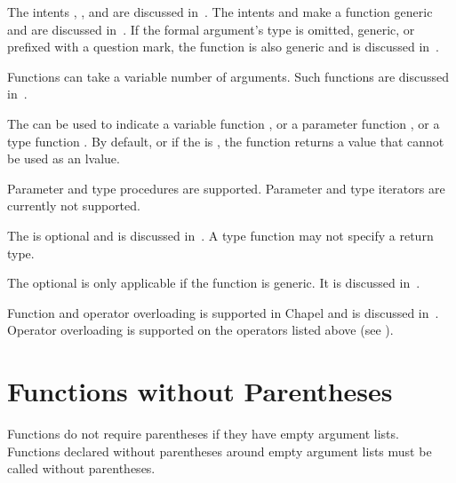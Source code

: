 The intents , , and  are discussed
in~.  The intents  and  make
a function generic and are discussed in~.  If the
formal argument's type is omitted, generic, or prefixed with a question
mark, the function is also generic and is discussed
in~.

Functions can take a variable number of arguments.  Such functions are
discussed in~.

The  can be used to indicate
a variable function ,
or a parameter function ,
or a type function .
By default, or if the  is ,
the function returns a value that cannot be used as an lvalue.

\begin{openissue}
Parameter and type procedures are supported. Parameter and type
iterators are currently not supported.
\end{openissue}

The  is optional and is discussed in~.
A type function may not specify a return type.

The optional  is only applicable if the function is
generic.  It is discussed in~.

Function and operator overloading is supported in Chapel and is
discussed in~.
Operator overloading is supported on the operators listed
above (see ).



\section{Functions without Parentheses}
\label{Functions_without_Parentheses}

Functions do not require parentheses if they have empty argument
lists.  Functions declared without parentheses around empty argument
lists must be called without parentheses.

